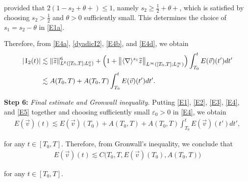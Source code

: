 \documentclass[letterpaper, 11pt,  reqno]{amsart}
\newcommand{\1}{\hspace{0.5mm}\text{I}\hspace{0.2mm}}
\newcommand{\noi}{\noindent}
\newcommand{\nb}{\nabla}
\newcommand{\eps}{\varepsilon}
\newcommand{\wt}{\widetilde}
\newcommand{\ta}{\theta}
\newcommand{\les}{\lesssim}
\newcommand{\jb}[1]
{\langle #1 \rangle}
\numberwithin{equation}{section}
\numberwithin{theorem}{section}
\begin{document}
\noi
provided that $2(1-s_2+\ta+) \leq 1$, namely 
$s_2 \ge \frac 12 + \ta+$, 
which is satisfied by choosing $s_2 > \frac 12$ and $\ta > 0$ sufficiently small.
 This determines the choice of $s_1 = s_2 - \ta$ in \eqref{E1a}.
 
Therefore, from 
 \eqref{E4a}, \eqref{dyadicI2}, \eqref{E4b}, and \eqref{E4d},  we obtain
\begin{align}
\begin{split}
|\1_2 (t)| 
& \les 
\|\wt z \|_{L^6([T_0, T]; L^6_x)}^6
+ 
\Big(1+\big\|\jb{\nb}^{s_1}  \wt z\big\|_{L^\infty([T_0, T]; L^\infty_x)}\Big)
\int_{T_0}^t 
E(\vec v)(t') dt'\\
& \les
A(T_0, T)
+ 
A(T_0, T)
\int_{T_0}^t 
E(\vec v)(t') dt'.
\end{split}
\label{E5}
\end{align}




\textbf{Step 6:} \textit{Final estimate and Gronwall inequality.}  Putting
\eqref{E1}, \eqref{E2}, \eqref{E3}, \eqref{E4}, and \eqref{E5} together
and choosing sufficiently small $\eps_0 > 0$ in \eqref{E4},  we obtain
\begin{align*}
 E(\vec v)(t)
\les E(\vec v)(T_0) + A(T_0, T) + A(T_0, T) \int_{T_0}^t E(\vec v)(t') dt',
\end{align*}

\noi
for any $t \in [T_0, T]$.
Therefore, from Gronwall's inequality,
we conclude that 
\begin{align}
 E(\vec v)(t)
\les C\big(T_0, T, E(\vec v)(T_0), A(T_0, T)\big)
\label{Ex}
\end{align}

\noi
for any $t \in [T_0, T]$.
\end{document}
